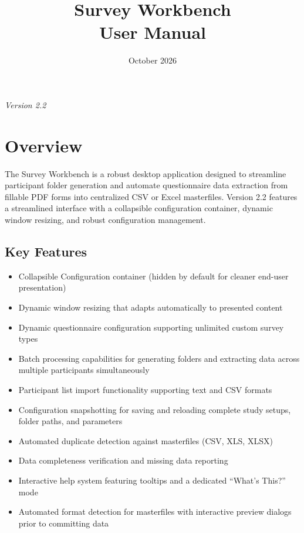 \documentclass[11pt,a4paper]{article}
\title{\textbf{Survey Workbench}\\[0.5em]\Large User Manual}
\author{}
\date{October 2026}
\begin{document}
\maketitle
\thispagestyle{empty}

\vfill
\begin{center}
\textit{Version 2.2}
\end{center}
\newpage

\tableofcontents
\newpage

\section{Overview}

The Survey Workbench is a robust desktop application designed to streamline participant folder generation and automate questionnaire data extraction from fillable PDF forms into centralized CSV or Excel masterfiles. Version 2.2 features a streamlined interface with a collapsible configuration container, dynamic window resizing, and robust configuration management.

\subsection{Key Features}
\begin{itemize}
    \item Collapsible Configuration container (hidden by default for cleaner end-user presentation)
    \item Dynamic window resizing that adapts automatically to presented content
    \item Dynamic questionnaire configuration supporting unlimited custom survey types
    \item Batch processing capabilities for generating folders and extracting data across multiple participants simultaneously
    \item Participant list import functionality supporting text and CSV formats
    \item Configuration snapshotting for saving and reloading complete study setups, folder paths, and parameters
    \item Automated duplicate detection against masterfiles (CSV, XLS, XLSX)
    \item Data completeness verification and missing data reporting
    \item Interactive help system featuring tooltips and a dedicated ``What's This?'' mode
    \item Automated format detection for masterfiles with interactive preview dialogs prior to committing data
\end{itemize}
\end{document}
